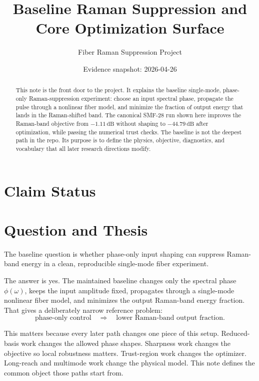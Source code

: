 \documentclass[11pt]{article}
\title{Baseline Raman Suppression and Core Optimization Surface}
\author{Fiber Raman Suppression Project}
\date{Evidence snapshot: 2026-04-26}
\begin{document}
\maketitle

\begin{abstract}
This note is the front door to the project. It explains the baseline
single-mode, phase-only Raman-suppression experiment: choose an input spectral
phase, propagate the pulse through a nonlinear fiber model, and minimize the
fraction of output energy that lands in the Raman-shifted band. The canonical
SMF-28 run shown here improves the Raman-band objective from
\(-1.11\,\mathrm{dB}\) without shaping to \(-44.79\,\mathrm{dB}\) after
optimization, while passing the numerical trust checks. The baseline is not
the deepest path in the repo. Its purpose is to define the physics, objective,
diagnostics, and vocabulary that all later research directions modify.
\end{abstract}

\section*{Claim Status}

\section{Question and Thesis}

The baseline question is whether phase-only input shaping can suppress
Raman-band energy in a clean, reproducible single-mode fiber experiment.

The answer is yes. The maintained baseline changes only the spectral phase
\(\phi(\omega)\), keeps the input amplitude fixed, propagates through a
single-mode nonlinear fiber model, and minimizes the output Raman-band energy
fraction. That gives a deliberately narrow reference problem:
\[
    \text{phase-only control}
    \quad\Longrightarrow\quad
    \text{lower Raman-band output fraction}.
\]

This matters because every later path changes one piece of this setup.
Reduced-basis work changes the allowed phase shapes. Sharpness work changes
the objective so local robustness matters. Trust-region work changes the
optimizer. Long-reach and multimode work change the physical model. This note
defines the common object those paths start from.
\end{document}
